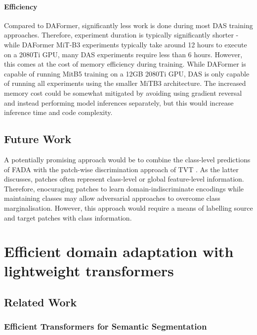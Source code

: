 \documentclass[a4paper,12pt]{report}
\begin{document}
\subsubsection{Efficiency}
Compared to DAFormer, significantly less work is done during most DAS training approaches. Therefore, experiment duration is typically significantly shorter - while DAFormer MiT-B3 experiments typically take around 12 hours to execute on a 2080Ti GPU, many DAS experiments require less than 6 hours. However, this comes at the cost of memory efficiency during training. While DAFormer is capable of running MitB5 training on a 12GB 2080Ti GPU, DAS is only capable of running all experiments using the smaller MiTB3 architecture. The increased memory cost could be somewhat mitigated by avoiding using gradient reversal and instead performing model inferences separately, but this would increase inference time and code complexity.

\section{Future Work}
A potentially promising approach would be to combine the class-level predictions of FADA \cite{wang_classes_2020} with the patch-wise discrimination approach of TVT \cite{yang_tvt_2021}. As the latter discusses, patches often represent class-level or global feature-level information. Therefore, enocuraging patches to learn domain-indiscriminate encodings while maintaining classes may allow adversarial approaches to overcome class marginalisation. However, this approach would require a means of labelling source and target patches with class information.

\chapter{Efficient domain adaptation with lightweight transformers}

\section{Related Work}

\subsection{Efficient Transformers for Semantic Segmentation}
\end{document}
